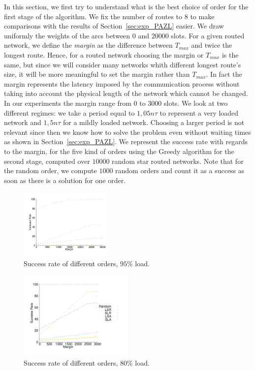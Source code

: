 \documentclass[10pt, conference, letterpaper]{IEEEtran}
\begin{document}
    
    In this section, we first try to understand what is the best choice of order for the first stage of the algorithm.
    We fix the number of routes to $8$ to make comparisons with the results of Section~\ref{sec:exp_PAZL} easier. 
    We draw uniformly the weights of the arcs between $0$ and $20000$ slots.
    For a given routed network, we define the {\em margin} as the difference between $T_{max}$ and twice the longest route. 
    Hence, for a routed network choosing the margin or $T_{max}$ is the same, but since we will consider many networks 
    whith different longest route's size, it will be more meaningful to set the margin rather than $T_{max}$.
    In fact the margin represents the latency imposed by the communication process without taking into account the physical length of the network which cannot be changed. In our experiments the margin range from  $0$ to $3000$ slots.
   We look at two different regimes: we take a period equal to $1,05n\tau$ to represent a very loaded network
   and $1,5n\tau$ for a mildly loaded network. Choosing a larger period is not relevant since then we know how to solve the problem even without waiting times as shown in Section~\ref{sec:exp_PAZL}. We represent the success rate with regards to the margin, for the five kind of orders using the Greedy algorithm for the second stage, computed over $10000$ random star routed networks. Note that for the random order, we compute $1000$ random orders and count it as a success as soon as there is a solution for one order. 
 
\begin{figure}[H] 
  
  \centering
     \hspace{-1.5cm} \includegraphics[width=0.4\textwidth]{departs_gp_21000.pdf}

      \caption{Success rate of different orders, $95\%$ load.}
          \end{figure}
\begin{figure}[H] 
          \includegraphics[width=0.5\textwidth]{departs_gp_25000.pdf}
      \caption{Success rate of different orders, $80\%$ load.}
           \label{fig:success30000}
     \end{figure}
     
\end{document}
